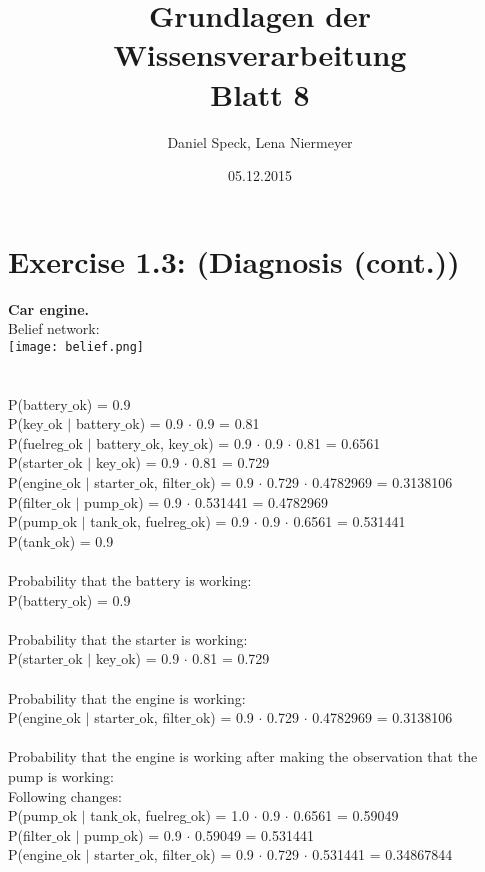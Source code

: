 \documentclass[10pt,a4paper]{article}
\title{\textbf{\huge Grundlagen der Wissensverarbeitung
		\\\Large Blatt 8}}
\author{Daniel Speck, Lena Niermeyer}
\date{05.12.2015}
\begin{document}
		
	\maketitle
		
	\section*{Exercise 1.3: (Diagnosis (cont.))}
	

\textbf{Car engine.}
\\
Belief network: \\
	\noindent
	\texttt{[image: belief.png]} \\ \\
	\\
	P(battery$\_$ok) = 0.9 \\
	P(key$\_$ok $|$ battery$\_$ok) = 0.9 $\cdot$ 0.9 = 0.81 \\
	P(fuelreg$\_$ok $|$ battery$\_$ok, key$\_$ok) = 0.9 $\cdot$ 0.9 $\cdot$ 0.81 = 0.6561 \\
	P(starter$\_$ok $|$ key$\_$ok) = 0.9 $\cdot$ 0.81 = 0.729 \\
	P(engine$\_$ok $|$ starter$\_$ok, filter$\_$ok) = 0.9 $\cdot$ 0.729 $\cdot$ 0.4782969 = 0.3138106 \\
	P(filter$\_$ok $|$ pump$\_$ok) = 0.9 $\cdot$ 0.531441 = 0.4782969 \\
	P(pump$\_$ok $|$ tank$\_$ok, fuelreg$\_$ok) = 0.9 $\cdot$ 0.9 $\cdot$ 0.6561 = 0.531441 \\
	P(tank$\_$ok) = 0.9 \\
	\\
	Probability that the battery is working: \\
	P(battery$\_$ok) = 0.9 \\ \\
	Probability that the starter is working: \\
	P(starter$\_$ok $|$ key$\_$ok) = 0.9 $\cdot$ 0.81 = 0.729 \\ \\
	Probability that the engine is working: \\
	P(engine$\_$ok $|$ starter$\_$ok, filter$\_$ok) = 0.9 $\cdot$ 0.729 $\cdot$ 0.4782969 = 0.3138106 \\ \\
	Probability  that  the  engine  is  working  after  making  the  observation  that  the
	pump is working: \\
	Following changes: \\
	P(pump$\_$ok $|$ tank$\_$ok, fuelreg$\_$ok) = 1.0 $\cdot$ 0.9 $\cdot$ 0.6561 = 0.59049 \\
	P(filter$\_$ok $|$ pump$\_$ok) = 0.9 $\cdot$ 0.59049 = 0.531441 \\
	P(engine$\_$ok $|$ starter$\_$ok, filter$\_$ok) = 0.9 $\cdot$ 0.729 $\cdot$ 0.531441 = 0.34867844 \\
\end{document}
